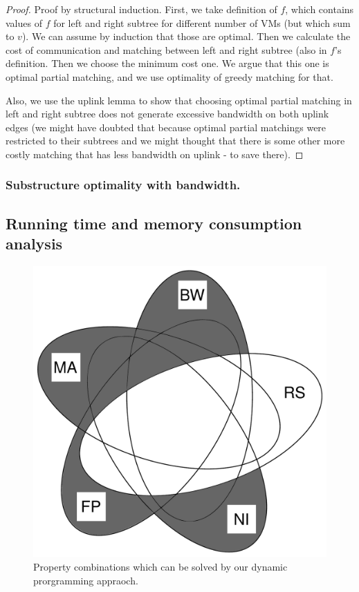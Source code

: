 \begin{proof}
Proof by structural induction. First, we take definition of $f$, which contains values of $f$ for left and right subtree for different number of VMs (but which sum to $v$). We can assume by induction that those are optimal. Then we calculate the cost of communication and matching between left and right subtree (also in $f$'s definition. Then we choose the minimum cost one. We argue that this one is optimal partial matching, and we use optimality of greedy matching for that.

Also, we use the uplink lemma to show that choosing optimal partial matching in left and right subtree does not generate excessive bandwidth on both uplink edges (we might have doubted that because optimal partial matchings were restricted to their subtrees and we might thought that there is some other more costly matching that has less bandwidth on uplink - to save there).
\end{proof}

\subsubsection{Substructure optimality with bandwidth.}
\subsection{Running time and memory consumption analysis}

\begin{figure}
\includegraphics[width=\columnwidth]{figs/venn_dp.pdf}
\caption{Property combinations which can be solved by our dynamic prorgramming 
appraoch.}
\label{fig:venn_dp}
\end{figure}

